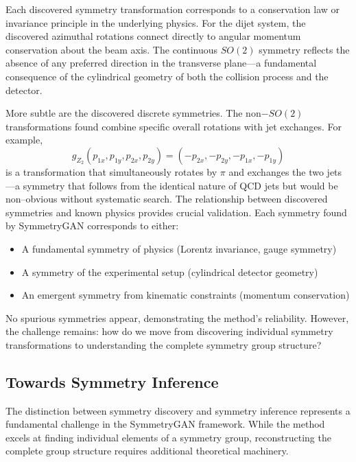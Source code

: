             Each discovered symmetry transformation corresponds to a conservation law or invariance principle in the underlying physics.
            For the dijet system, the discovered azimuthal rotations connect directly to angular momentum conservation about the beam axis.
            The continuous \(SO(2)\) symmetry reflects the absence of any preferred direction in the transverse plane—a fundamental consequence of the cylindrical geometry of both the collision process and the detector.
            
            More subtle are the discovered discrete symmetries.
            The non\(-SO(2)\) transformations found combine specific overall rotations with jet exchanges.
            For example,
            \[
                g_{Z_2}(p_{1x}, p_{1y}, p_{2x}, p_{2y}) = (-p_{2x}, -p_{2y}, -p_{1x}, -p_{1y})
            \]
            is a transformation that simultaneously rotates by \(\pi\) and exchanges the two jets---a symmetry that follows from the identical nature of QCD jets but would be non--obvious without systematic search.        
            The relationship between discovered symmetries and known physics provides crucial validation.
            Each symmetry found by SymmetryGAN corresponds to either:
            \begin{itemize}
                \item A fundamental symmetry of physics (Lorentz invariance, gauge symmetry)
                \item A symmetry of the experimental setup (cylindrical detector geometry)
                \item An emergent symmetry from kinematic constraints (momentum conservation)
            \end{itemize}
            No spurious symmetries appear, demonstrating the method's reliability.
            However, the challenge remains: how do we move from discovering individual symmetry transformations to understanding the complete symmetry group structure?

        \subsection{Towards Symmetry Inference}
            The distinction between symmetry discovery and symmetry inference represents a fundamental challenge in the SymmetryGAN framework.
            While the method excels at finding individual elements of a symmetry group, reconstructing the complete group structure requires additional theoretical machinery.
            
